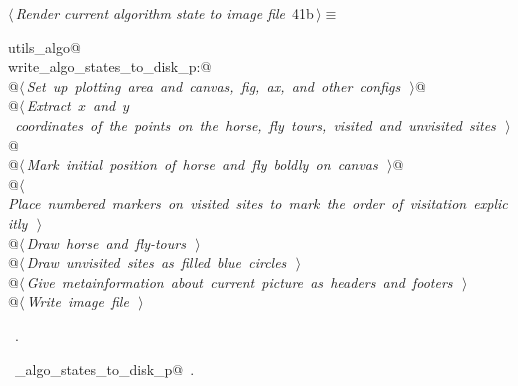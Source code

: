 \documentclass[11.5pt]{report}
\begin{document}
\begin{flushleft} \small\label{scrap51}\raggedright\small
{} $\langle\,${\itshape Render current algorithm state to image file}\nobreak\ {\footnotesize {41b}}$\,\rangle\equiv$
\vspace{-1ex}
\begin{list}{}{} \item
\mbox{}\verb@import utils_algo@\\
\mbox{}\verb@if write_algo_states_to_disk_p:@\\
\mbox{}\verb@     @\hbox{$\langle\,${\itshape Set up plotting area and canvas, fig, ax, and other configs}\nobreak\ {\footnotesize {}}$\,\rangle$}\verb@  @\\
\mbox{}\verb@     @\hbox{$\langle\,${\itshape Extract $x$ and $y$ coordinates of the points on the horse, fly tours, visited and unvisited sites}\nobreak\ {\footnotesize {}}$\,\rangle$}\verb@  @\\
\mbox{}\verb@     @\hbox{$\langle\,${\itshape Mark initial position of horse and fly boldly on canvas}\nobreak\ {\footnotesize {}}$\,\rangle$}\verb@  @\\
\mbox{}\verb@     @\hbox{$\langle\,${\itshape Place numbered markers on visited sites to mark the order of visitation explicitly}\nobreak\ {\footnotesize {}}$\,\rangle$}\verb@@\\
\mbox{}\verb@     @\hbox{$\langle\,${\itshape Draw horse and fly-tours}\nobreak\ {\footnotesize {}}$\,\rangle$}\verb@@\\
\mbox{}\verb@     @\hbox{$\langle\,${\itshape Draw unvisited sites as filled blue circles}\nobreak\ {\footnotesize {}}$\,\rangle$}\verb@@\\
\mbox{}\verb@     @\hbox{$\langle\,${\itshape Give metainformation about current picture as headers and footers}\nobreak\ {\footnotesize {}}$\,\rangle$}\verb@@\\
\mbox{}\verb@     @\hbox{$\langle\,${\itshape Write image file}\nobreak\ {\footnotesize {}}$\,\rangle$}\verb@@\\
\mbox{}\verb@@{\NWsep}
\end{list}
\vspace{-1.5ex}
\footnotesize
\begin{list}{}{\setlength{\itemsep}{-\parsep}\setlength{\itemindent}{-\leftmargin}}
\item \NWtxtMacroRefIn\ .
\item \NWtxtIdentsUsed\nobreak\  \verb@write_algo_states_to_disk_p@\nobreak\ .
\item{}
\end{list}
\vspace{4ex}
\end{flushleft}
\end{document}

